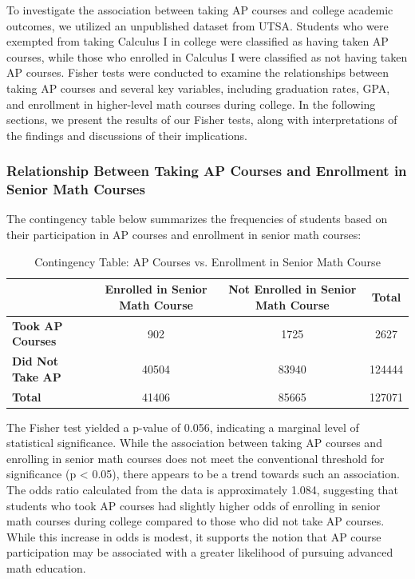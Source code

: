 \documentclass[sn-mathphys-num]{sn-jnl}%
\theoremstyle{thmstyleone}%
\theoremstyle{thmstyletwo}%
\theoremstyle{thmstylethree}%
\begin{document}
{To investigate the association between taking AP courses and college academic outcomes, we utilized an unpublished dataset from UTSA. Students who were exempted from taking Calculus I in college were classified as having taken AP courses, while those who enrolled in Calculus I were classified as not having taken AP courses. Fisher tests were conducted to examine the relationships between taking AP courses and several key variables, including graduation rates, GPA, and enrollment in higher-level math courses during college. In the following sections, we present the results of our Fisher tests, along with interpretations of the findings and discussions of their implications.\\


\subsubsection{Relationship Between Taking AP Courses and Enrollment in Senior Math Courses}

The contingency table below summarizes the frequencies of students based on their participation in AP courses and enrollment in senior math courses:\\

\begin{table}[htbp]
\centering
\caption{Contingency Table: AP Courses vs. Enrollment in Senior Math Course}
\begin{tabular}{|l|c|c|c|}
\hline
 & \textbf{Enrolled in Senior Math Course} & \textbf{Not Enrolled in Senior Math Course} & \textbf{Total} \\ \hline
\textbf{Took AP Courses} & 902 & 1725 & 2627 \\ \hline
\textbf{Did Not Take AP} & 40504 & 83940 & 124444 \\ \hline
\textbf{Total} & 41406 & 85665 & 127071 \\ \hline
\end{tabular}
\end{table}

The Fisher test yielded a p-value of 0.056, indicating a marginal level of statistical significance. While the association between taking AP courses and enrolling in senior math courses does not meet the conventional threshold for significance (p < 0.05), there appears to be a trend towards such an association.\\

The odds ratio calculated from the data is approximately 1.084, suggesting that students who took AP courses had slightly higher odds of enrolling in senior math courses during college compared to those who did not take AP courses. While this increase in odds is modest, it supports the notion that AP course participation may be associated with a greater likelihood of pursuing advanced math education.\\

}
\end{document}
